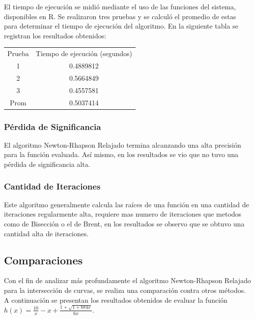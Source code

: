 \documentclass[a4paper,12pt]{article}
\begin{document}
El tiempo de ejecución se midió mediante el uso de las funciones del sistema, disponibles en R. Se realizaron tres pruebas y se calculó el promedio de estas para determinar el tiempo de ejecución del algoritmo.  En la siguiente tabla se registran los resultados obtenidos: \par 

\begin{table}[ht!]
\begin{tabular}{cc}
Prueba & Tiempo de ejecución (segundos) \\
1      & 0.4889812                      \\
2      & 0.5664849                       \\
3      & 0.4557581                     \\
Prom   & 0.5037414                     
\end{tabular}
\end{table}
\vspace{-1em}

\subsubsection{Pérdida de Significancia}

El algoritmo Newton-Rhapson Relajado termina alcanzando una alta precisión para la función evaluada. Así mismo, en los resultados se vio que no tuvo una pérdida de significancia alta. \par 

\subsubsection{Cantidad de Iteraciones}

Este algoritmo generalmente calcula las raíces de una función en una cantidad de iteraciones regularmente alta, requiere mas numero de iteraciones que metodos como de Bisección o el de Brent, en los resultados se observo que se obtuvo una cantidad alta de iteraciones. \par 

\newpage 

\subsection{Comparaciones}

Con el fin de analizar más profundamente el algoritmo Newton-Rhapson Relajado para la intersección de curvas, se realiza una comparación contra otros métodos. A continuación se presentan los resultados obtenidos de evaluar la función $h(x)=\frac{10}{x}-x +\frac{1 + \sqrt{1 + 684 x}}{6x}$. \par
\end{document}
